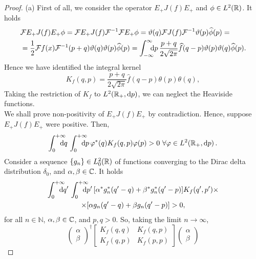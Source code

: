 \begin{proof}
	(a) First of all, we consider the operator $E_+J(f)E_+$ and $\phi\in L^2({\mathbb R})$. It holds
	\begin{equation}
	\begin{aligned}
	& \mathcal{F}E_+J(f)E_+\phi=\mathcal{F}E_+J(f)\mathcal{F}^{-1}\mathcal{F}E_+\phi=\vartheta(q)\mathcal{F}J(f)\mathcal{F}^{-1}\vartheta(p)\widehat{\phi}(p)= \\
	& = \frac{1}{2}\mathcal{F}f(x)\mathcal{F}^{-1}(p+q)\vartheta(q)\vartheta(p)\widehat{\phi}(p)=\int_{-\infty}^{\infty}\!\!\!\!\mathrm d p\, \frac{p+q}{2\sqrt{2\pi}}\widehat{f}(q-p)\vartheta(p)\vartheta(q)\widehat{\phi}(p).
	\end{aligned}
	\end{equation}
	Hence we have identified the integral kernel
	\begin{equation}
	K_f(q,p)=\frac{p+q}{2\sqrt{2\pi}}\hat{f}(q-p)\theta(p)\theta(q),
	\end{equation}
	Taking the restriction of $K_f$ to $L^2({\mathbb R}_+,\mathrm d p)$, we can neglect the Heaviside functions.\\
	We shall prove non-positivity of $E_+J(f)E_+$ by contradiction. Hence, suppose $E_+J(f)E_+$ were positive. Then,
	\begin{equation}
	\int_{0}^{+\infty}\nspace\nspace\dd q\,\int_{0}^{+\infty}\nspace\nspace \dd p\, \varphi^*(q)K_f(q,p)\varphi(p)>0\ \forall\varphi\in L^2(\mR_+,\dd p)\, .
	\end{equation}
	Consider a sequence $\{g_n\}\in L^2_0({\mathbb R})$ of functions converging to the Dirac delta distribution $\delta_0$, and $\alpha,\beta\in{\mathbb C}$. It holds 
	\begin{multline}
	\int_{0}^{+\infty}\nspace \nspace \dd q'\,\int_{0}^{+\infty}\nspace\nspace \dd p'\, [\alpha^*g_n^*(q'-q)+\beta^*g_n^*(q'-p)]K_f(q',p')\times\\ \times[\alpha g_n(q'-q)+\beta g_n(q'-p)]>0,
	\end{multline}
	for all $n\in\mathbb{N}$, $\alpha,\beta\in{\mathbb C}$, and $p,q>0$. So, taking the limit $n\to\infty$,
	\begin{equation}
	\begin{pmatrix}
	\alpha \\\beta
	\end{pmatrix}^\dagger
	\begin{bmatrix}
	K_f(q,q) & K_f(q,p)\\
	K_f(q,p) & K_f(p,p)
	\end{bmatrix}
	\begin{pmatrix}
	\alpha\\ \beta

\end{pmatrix}
\end{equation}
\end{proof}
